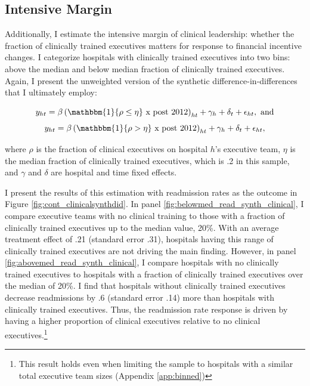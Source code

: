 \documentclass[12pt]{article}
\begin{document}
\begin{figure}[ht!]
\begin{subfigure}[b]{0.45\textwidth}
         \label{fig:mort_synth_clinical}
     \end{subfigure}
        \label{fig:clinicalsynthdid}
    \end{figure}

    \subsection{Intensive Margin}

    Additionally, I estimate the intensive margin of clinical leadership: whether the fraction of clinically trained executives matters for response to financial incentive changes. I categorize hospitals with clinically trained executives into two bins: above the median and below median fraction of clinically trained executives. Again, I present the unweighted version of the synthetic difference-in-differences that I ultimately employ:

    \begin{equation}
    \label{eq:clinical_continuous_onefourth}
    y_{ht} = \beta \left(\mathbbm{1}\{\rho \leq \eta\}\text{ x post 2012}\right)_{ht} + \gamma_{h} + \delta_t + \epsilon_{ht}, \text{ and}
    \end{equation}
    \begin{equation}
    \label{eq:clinical_continuous_onehalf}
    y_{ht} = \beta \left(\mathbbm{1}\{\rho > \eta\}\text{ x post 2012}\right)_{ht} + \gamma_{h} + \delta_t + \epsilon_{ht},
    \end{equation}

    \noindent where $\rho$ is the fraction of clinical executives on hospital $h$'s executive team, $\eta$ is the median fraction of clinically trained executives, which is .2 in this sample, and $\gamma$ and $\delta$ are hospital and time fixed effects. 

    I present the results of this estimation with readmission rates as the outcome in Figure \ref{fig:cont_clinicalsynthdid}. In panel \ref{fig:belowmed_read_synth_clinical}, I compare executive teams with no clinical training to those with a fraction of clinically trained executives up to the median value, 20\%. With an average treatment effect of .21 (standard error .31), hospitals having this range of clinically trained executives are not driving the main finding. However, in panel \ref{fig:abovemed_read_synth_clinical}, I compare hospitals with no clinically trained executives to hospitals with a fraction of clinically trained executives over the median of 20\%. I find that hospitals without clinically trained executives decrease readmissions by .6 (standard error .14) more than hospitals with clinically trained executives. Thus, the readmission rate response is driven by having a higher proportion of clinical executives relative to no clinical executives.\footnote{This result holds even when limiting the sample to hospitals with a similar total executive team sizes (Appendix \ref{app:binned})}
\end{document}
